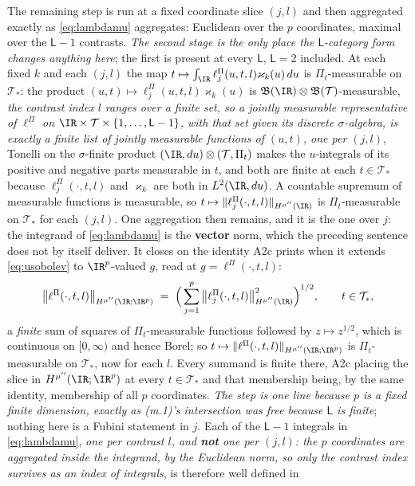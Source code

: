 The remaining step is run at a fixed coordinate slice $(j,l)$ and then aggregated exactly as
\eqref{eq:lambdamu} aggregates: Euclidean over the $p$ coordinates, maximal over the $\mathsf L-1$
contrasts. \emph{The second stage is the only place the $\mathsf L$-category form changes anything
here}; the first is present at every $\mathsf L$, $\mathsf L=2$ included. At each fixed $k$ and
each $(j,l)$ the map $t\mapsto\int_{\IR}\ell^\Pi_j(u,t,l)\varkappa_k(u)\,du$ is $\Pi_t$-measurable
on $\mathcal T_\ast$: the product $(u,t)\mapsto\ell^\Pi_j(u,t,l)\varkappa_k(u)$ is
$\mathfrak B(\IR)\otimes\mathfrak B(\mathcal T)$-measurable, \emph{the contrast index $l$ ranges over
a finite set, so a jointly measurable representative of $\ell^\Pi$ on
$\IR\times\mathcal T\times\{1,\dots,\mathsf L-1\}$, with that set given its discrete $\sigma$-algebra, is
exactly a finite list of jointly measurable functions of $(u,t)$, one per $(j,l)$}, Tonelli on the
$\sigma$-finite product
$(\IR,du)\otimes(\mathcal T,\Pi_t)$ makes the $u$-integrals of its positive and negative parts measurable
in $t$, and both are finite at each $t\in\mathcal T_\ast$ because $\ell^\Pi_j(\cdot,t,l)$ and $\varkappa_k$
are both in $L^{2}(\IR,du)$. A countable supremum of measurable functions is measurable, so
$t\mapsto\|\ell^\Pi_j(\cdot,t,l)\|_{H^{\mu''}(\IR)}$ is $\Pi_t$-measurable on $\mathcal T_\ast$ for each
$(j,l)$.
One aggregation then remains, and it is the one over $j$: the integrand of \eqref{eq:lambdamu} is
the \textbf{vector} norm, which the preceding sentence does not by itself deliver. It closes on the
identity A2c prints when it extends \eqref{eq:usobolev} to $\IR^{p}$-valued $g$, read at
$g=\ell^\Pi(\cdot,t,l)$:
\[
\big\|\ell^\Pi(\cdot,t,l)\big\|_{H^{\mu''}(\IR;\IR^{p})}
\;=\;\Big(\sum_{j=1}^{p}\big\|\ell^\Pi_j(\cdot,t,l)\big\|^{2}_{H^{\mu''}(\IR)}\Big)^{1/2},
\qquad t\in\mathcal T_\ast ,
\]
a \emph{finite} sum of squares of $\Pi_t$-measurable functions followed by $z\mapsto z^{1/2}$, which is
continuous on $[0,\infty)$ and hence Borel; so
$t\mapsto\|\ell^\Pi(\cdot,t,l)\|_{H^{\mu''}(\IR;\IR^{p})}$ is $\Pi_t$-measurable on $\mathcal T_\ast$,
now for each $l$. Every summand is finite there, A2c placing the slice in $H^{\mu''}(\IR;\IR^{p})$ at
every $t\in\mathcal T_\ast$ and that membership being, by the same identity, membership of all $p$
coordinates. \emph{The step is one line because $p$ is a fixed finite dimension, exactly as
\textup{(m.1)}'s intersection was free because $\mathsf L$ is finite}; nothing here is a Fubini
statement in $j$.
Each of the $\mathsf L-1$ integrals in \eqref{eq:lambdamu}, \emph{one per contrast $l$, and
\textbf{not} one per $(j,l)$: the $p$ coordinates are aggregated inside the integrand, by the Euclidean
norm, so only the contrast index survives as an index of integrals}, is therefore well defined in
